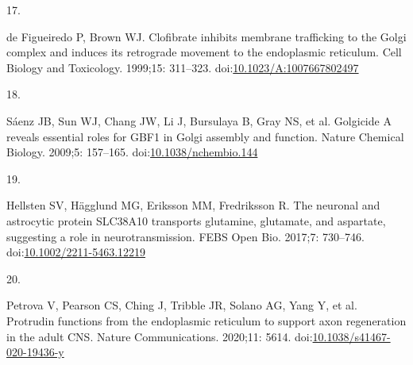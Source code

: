 \documentclass[
  12pt,
  a4paper,
]{article}
\newlength{\cslhangindent}
\newlength{\csllabelwidth}
\newlength{\cslentryspacingunit} %
\newenvironment{CSLReferences}[2] %
 {%
  \setlength{\parindent}{0pt}
  \ifodd #1
  \let\oldpar\par
  \def\par{\hangindent=\cslhangindent\oldpar}
  \fi
  \setlength{\parskip}{#2\cslentryspacingunit}
 }%
 {}
\newcommand{\CSLLeftMargin}[1]{\parbox[t]{\csllabelwidth}{#1}}
\newcommand{\CSLRightInline}[1]{\parbox[t]{\linewidth - \csllabelwidth}{#1}\break}
\begin{document}
\begin{CSLReferences}{0}{0}
\leavevmode{}%
\CSLLeftMargin{17. }%
\CSLRightInline{de Figueiredo P, Brown WJ. Clofibrate inhibits membrane
trafficking to the {Golgi} complex and induces its retrograde movement
to the endoplasmic reticulum. Cell Biology and Toxicology. 1999;15:
311--323.
doi:\href{https://doi.org/10.1023/A:1007667802497}{10.1023/A:1007667802497}}

\leavevmode{}%
\CSLLeftMargin{18. }%
\CSLRightInline{Sáenz JB, Sun WJ, Chang JW, Li J, Bursulaya B, Gray NS,
et al. Golgicide {A} reveals essential roles for {GBF1} in {Golgi}
assembly and function. Nature Chemical Biology. 2009;5: 157--165.
doi:\href{https://doi.org/10.1038/nchembio.144}{10.1038/nchembio.144}}

\leavevmode{}%
\CSLLeftMargin{19. }%
\CSLRightInline{Hellsten SV, Hägglund MG, Eriksson MM, Fredriksson R.
The neuronal and astrocytic protein {SLC38A10} transports glutamine,
glutamate, and aspartate, suggesting a role in neurotransmission. FEBS
Open Bio. 2017;7: 730--746.
doi:\href{https://doi.org/10.1002/2211-5463.12219}{10.1002/2211-5463.12219}}

\leavevmode{}%
\CSLLeftMargin{20. }%
\CSLRightInline{Petrova V, Pearson CS, Ching J, Tribble JR, Solano AG,
Yang Y, et al. Protrudin functions from the endoplasmic reticulum to
support axon regeneration in the adult {CNS}. Nature Communications.
2020;11: 5614.
doi:\href{https://doi.org/10.1038/s41467-020-19436-y}{10.1038/s41467-020-19436-y}}

\end{CSLReferences}
\end{document}
